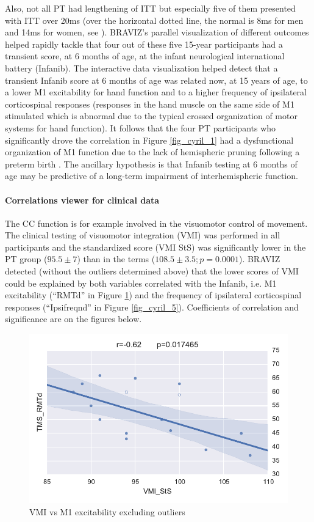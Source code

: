 \documentclass[twocolumn]{svjour3}
\begin{document}
Also, not all PT had lengthening of ITT but especially five of them presented with ITT over 20ms (over the horizontal dotted line, the normal is 8ms for men and 14ms for women, see \cite{schneider_cerebral_2012}). BRAVIZ’s parallel visualization of different outcomes helped rapidly tackle that four out of these five 15-year participants had a transient score, at 6 months of age, at the infant neurological international battery (Infanib). 
The interactive data visualization helped detect that a transient Infanib score at 6 months of age was related now, at 15 years of age, to a lower M1 excitability for hand function and to a higher frequency of ipsilateral corticospinal responses (responses in the hand muscle on the same side of M1 stimulated which is abnormal due to the typical crossed organization of motor systems for hand function). It follows that the four PT participants who significantly drove the correlation in Figure \ref{fig_cyril_1} had a dysfunctional organization of M1 function due to the lack of hemispheric pruning following a preterm birth \cite{schneider_cerebral_2012}. The ancillary hypothesis is that Infanib testing at 6 months of age may be predictive of a long-term impairment of interhemispheric function.

\paragraph{Correlations viewer for clinical data}


The CC function is for example involved in the visuomotor control of movement. The clinical testing of visuomotor integration (VMI) was performed in all participants and the standardized score (VMI StS) was significantly lower in the PT group ($95.5 \pm 7$) than in the terms ($108.5 \pm 3.5 ; p=0.0001$). 
BRAVIZ detected (without the outliers determined above) that the lower scores of VMI could be explained by both variables correlated with the Infanib, i.e. M1 excitability (``RMTd'' in Figure \ref{fig_cyril_4}) and the frequency of ipsilateral corticospinal responses (``Ipsifreqnd'' in Figure \ref{fig_cyril_5}). Coefficients of correlation and significance are on the figures below.

\begin{figure}
	\centering
		\includegraphics[width=0.9\linewidth]{cyricl_corr_1}
	\caption{VMI vs M1 excitability excluding outliers}
	\label{fig_cyril_4}
\end{figure}
\end{document}
